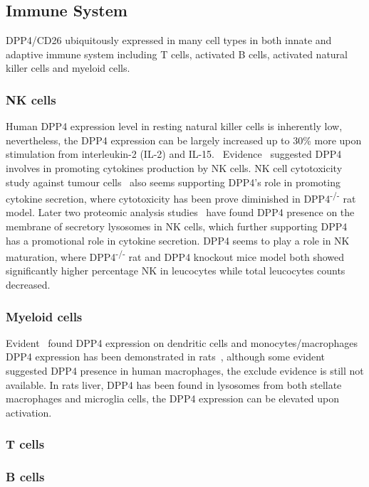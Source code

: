 \subsection{Immune System}
DPP4/CD26 ubiquitously expressed in many cell types in both innate and adaptive immune system including T cells, activated B cells, activated natural killer cells and myeloid cells.~\cite{Abbott1994,Shingu2003,Hong1989,Gutschmidt1981,Dikov2004,Bühling1995,Tanaka1992,Gorrell1991} 

\subsubsection{NK cells}
Human DPP4 expression level in resting natural killer cells is inherently low, nevertheless, the DPP4 expression can be largely increased up to 30\% more upon stimulation from interleukin-2 (IL-2) and IL-15.~\cite{Bühling1994,Biuling1990,Yamabe1997} Evidence~\cite{Madueño1993,Roloff2005} suggested DPP4 involves in promoting cytokines production by NK cells. NK cell cytotoxicity study against tumour cells~\cite{Shingu2003,Frerker2009} also seems supporting DPP4's role in promoting cytokine secretion, where cytotoxicity has been prove diminished in DPP4\textsuperscript{-/-} rat model. Later two proteomic analysis studies~\cite{Topham2009,Casey2007} have found DPP4 presence on the membrane of secretory lysosomes in NK cells, which further supporting DPP4 has a promotional role in cytokine secretion. DPP4 seems to play a role in NK maturation, where DPP4\textsuperscript{-/-} rat and DPP4 knockout mice model both showed significantly higher percentage NK in leucocytes while total leucocytes counts decreased.~\cite{Yan2003,Frerker2009}

\subsubsection{Myeloid cells}
Evident~\cite{Zhong2013,Gliddon2002} found DPP4 expression on dendritic cells and monocytes/macrophages DPP4 expression has been demonstrated in rats~\cite{Epardaud2004, Ellingsen2007}, although some evident~\cite{Shah_2011} suggested DPP4 presence in human macrophages, the exclude evidence is still not available. In rats liver, DPP4 has been found in lysosomes from both stellate macrophages and microglia cells, the DPP4 expression can be elevated upon activation.~\cite{Fukui1990} 

\subsubsection{T cells}

\subsubsection{B cells}
